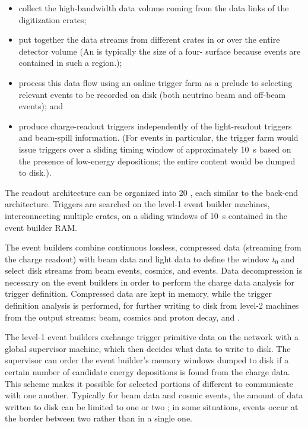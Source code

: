 \begin{itemize}
\item collect the high-bandwidth data volume coming from the data links of the  digitization crates; 
\item put together the data streams from different crates in  or over the entire detector volume (An  is typically the size of a  four- surface because events are contained in such a region.);
\item process this data flow using an online trigger farm  as a prelude to selecting relevant events to be recorded on disk (both neutrino beam and off-beam events); and 
\item produce charge-readout triggers independently of the light-readout triggers and beam-spill information. 
(For  events in particular, the trigger farm would issue triggers over a sliding timing window of approximately \SI{10}{s}  based on the presence of low-energy depositions; the entire content would be dumped to disk.).
\end{itemize}

The  readout architecture can be organized into \num{20} , each similar to the  back-end architecture. Triggers are searched on the level-1 event builder machines, interconnecting multiple  crates, on a sliding windows of \SI{10}{s}  contained in the event builder RAM.

The event builders combine continuous lossless, compressed data (streaming from the charge readout) with beam data and light data to define the window $t_0$ and select disk streams from beam events, cosmics, and  events. Data decompression is necessary on the event builders in order to perform the charge data analysis for trigger definition. Compressed data are kept in memory, while the trigger definition analysis is performed, for further writing to disk from level-2 machines from the output streams: beam, cosmics and proton decay, and . 

The level-1 event builders exchange trigger primitive data on the network with a global supervisor machine, which then decides what data to write to disk.  The supervisor can order the event builder's memory  windows dumped to disk if a certain number of candidate energy depositions is found from the charge data.  This scheme makes it possible for selected portions of different  to communicate with one another.  
Typically for beam data and cosmic events, the amount of data written to disk can be limited to one or two ; in some situations, events occur at the border between two  rather than in a single one.


